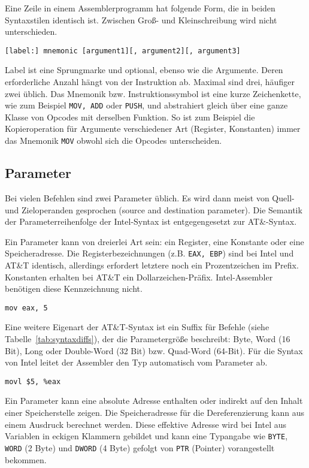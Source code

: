 Eine Zeile in einem Assemblerprogramm hat folgende Form, die in beiden
Syntaxstilen identisch ist. Zwischen Groß- und Kleinschreibung wird nicht unterschieden.

\texttt{[label:] mnemonic [argument1][, argument2][, argument3]}

Label ist eine Sprungmarke und optional, ebenso wie die Argumente. Deren
erforderliche Anzahl hängt von der Instruktion ab. Maximal sind drei, häufiger zwei
üblich. Das Mnemonik bzw. Instruktionssymbol ist eine kurze
Zeichenkette, wie zum Beispiel {\tt MOV, ADD} oder {\tt PUSH}, und abstrahiert gleich über eine ganze Klasse von Opcodes mit derselben Funktion.\cite{intelmanual} So ist zum
Beispiel die Kopieroperation für Argumente verschiedener Art (Register,
Konstanten) immer das Mnemonik {\tt MOV} obwohl sich die Opcodes unterscheiden.

\subsection{Parameter}

Bei vielen Befehlen sind zwei Parameter üblich. Es wird dann meist von Quell-
und Zieloperanden gesprochen (source and destination parameter). Die Semantik
der Parameterreihenfolge der Intel-Syntax ist entgegengesetzt zur AT\&-Syntax.

Ein Parameter kann von dreierlei Art sein: ein Register, eine Konstante oder
eine Speicheradresse. Die Registerbezeichnungen (z.B. {\tt EAX, EBP}) sind bei Intel und
AT\&T identisch, allerdings erfordert letztere noch ein Prozentzeichen im
Prefix. Konstanten erhalten bei AT\&T ein Dollarzeichen-Präfix. Intel-Assembler
benötigen diese Kennzeichnung nicht.

\hspace{5mm} 
\texttt{mov eax, 5}

Eine weitere Eigenart der AT\&T-Syntax ist ein Suffix für Befehle (siehe
Tabelle~\ref{tab:syntaxdiffs}), der die Parametergröße beschreibt: Byte, Word
(16 Bit), Long oder Double-Word  (32 Bit) bzw.  Quad-Word (64-Bit). Für die
Syntax von Intel leitet der Assembler den Typ automatisch vom Parameter ab.

\hspace{5mm} 
\texttt{movl \$5, \%eax}

Ein Parameter kann eine absolute Adresse enthalten oder indirekt auf den Inhalt
einer Speicherstelle zeigen. Die Speicheradresse für die Dereferenzierung kann
aus einem Ausdruck berechnet werden.  Diese effektive Adresse wird bei Intel
aus Variablen in eckigen Klammern gebildet und kann eine Typangabe wie
\texttt{BYTE},  \texttt{WORD} (2 Byte) und \texttt{DWORD} (4 Byte) gefolgt von  \texttt{PTR}
(Pointer) vorangestellt bekommen.

